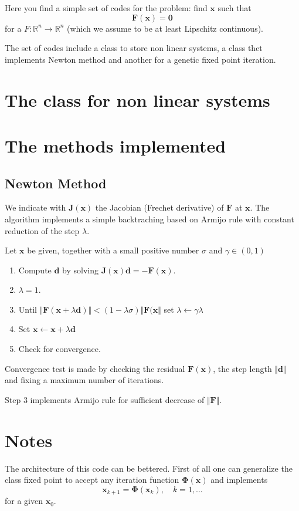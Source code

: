 \documentclass[12pt,twoside]{article}
\begin{document}
Here you find a simple set of codes for the problem: find $\mathbf{x}$ such that
\[
\mathbf{F}(\mathbf{x})=\mathbf{0}
\]
for a $F:\mathbb{R}^n\to\mathbb{R}^n$ (which we assume to be at least Lipschitz continuous).

The set of codes include a class to store non linear systems, a class thet implements Newton method and another for a genetic fixed point iteration.
\section{The class for non linear systems}

\section{The methods implemented}
\subsection{Newton Method}
We indicate with $\boldsymbol{J}(\mathbf{x})$ the Jacobian (Frechet derivative) of $\mathbf{F}$ at $\mathbf{x}$. The algorithm implements a simple backtraching
based on Armijo rule with constant reduction of the step $\lambda$.

Let $\mathbf{x}$ be given, together with a small positive number $\sigma$ and
$\gamma\in (0,1)$
\begin{enumerate}
\item Compute $\mathbf{d}$ by solving
$
\boldsymbol{J}(\mathbf{x})\mathbf{d}=-\mathbf{F}(\mathbf{x}).
$
\item $\lambda=1$.
\item Until $\Vert\mathbf{F}(\mathbf{x}+\lambda\mathbf{d})\Vert< (1-\lambda\sigma)\Vert \mathbf{F}(\mathbf{x}\Vert$ set $\lambda\leftarrow
\gamma\lambda$
\item Set $\mathbf{x}\leftarrow\mathbf{x}+\lambda\mathbf{d}$
\item Check for convergence.
\end{enumerate}
Convergence test is made by checking the residual $\mathbf{F}(\mathbf{x})$, the
step length $\Vert \mathbf{d}\Vert$ and fixing a maximum number of iterations.

Step 3 implements Armijo rule for sufficient decrease of $\Vert\mathbf{F}\Vert$.

\section{Notes}
The architecture of this code can be bettered. First of all one can generalize the class fixed point to accept any iteration function $\boldsymbol{\Phi}(\mathbf{x})$ and implements
\[
\mathbf{x}_{k+1}=\boldsymbol{\Phi}(\mathbf{x}_k), \quad k=1,\ldots
\]
for a given $\mathbf{x}_0$.
\end{document}
